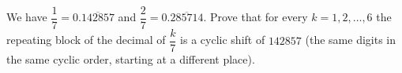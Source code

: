 We have $\dfrac{1}{7}=0.\overline{142857}$ and $\dfrac{2}{7}=0.\overline{285714}$. Prove that for every $k=1,2,\dots,6$ the repeating block of the decimal of $\dfrac{k}{7}$ is a cyclic shift of $142857$ (the same digits in the same cyclic order, starting at a different place).
